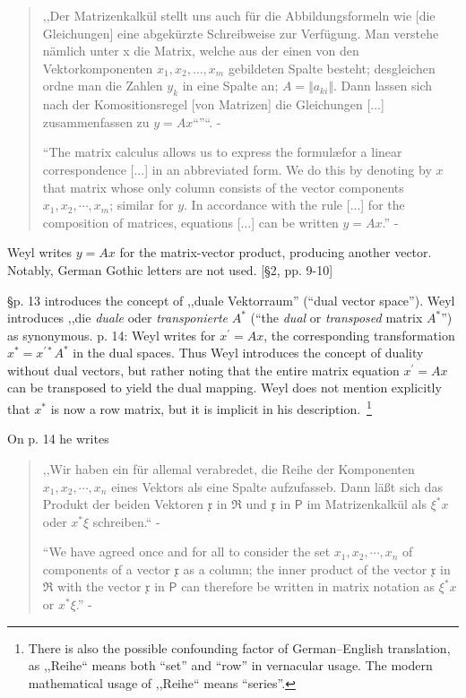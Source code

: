 \begin{quote}
,,Der Matrizenkalkül stellt uns auch für die Abbildungsformeln wie [die Gleichungen]
 eine abgekürzte Schreibweise zur Verfügung. Man verstehe nämlich unter x die Matrix, welche aus der einen von den Vektorkomponenten $x_1, x_2, \dots, x_m$ gebildeten Spalte besteht; desgleichen ordne man die Zahlen $y_k$ in eine Spalte an; $A = \Vert a_{ki} \Vert$. Dann lassen sich nach der Komositionsregel [von Matrizen] die Gleichungen [...] zusammenfassen zu $y = Ax$``''``. - \cite[p. 10]{Weyl1928}

``The matrix calculus allows us to express the formul\ae for
a linear correspondence [...] in an abbreviated form.
We do this by denoting by $x$ that matrix whose only column consists of the
vector components $x_1, x_2, \cdots, x_m$; similar
for $y$. In accordance with the rule [...] for the composition of
matrices, equations [...] can be written $y = Ax$.'' - \cite[p. 8]{Weyl1931}
\end{quote}

Weyl writes $y = A x$ for the matrix-vector product, producing another vector.
Notably, German Gothic letters are not used. [\S 2, pp. 9-10]

\S p. 13 introduces the concept of ,,duale Vektorraum'' (``dual vector space'').
Weyl introduces ,,die \textit{duale} oder \textit{transponierte} $A^*$
(``the \textit{dual} or \textit{transposed} matrix $A^*$'')
as synonymous.
p. 14: Weyl writes for $x^\prime = A x$, the corresponding transformation $x^* = x^{\prime *} A^*$
in the dual spaces.
Thus Weyl introduces the concept of duality without dual vectors, but rather noting
that the entire matrix equation $x^\prime = A x$ can be transposed to yield the
dual mapping. Weyl does not mention explicitly that $x^*$ is now a row matrix, but it is
implicit in his description.~\footnote{There is also the possible confounding
factor of German--English translation, as ,,Reihe`` means both ``set'' and ``row''
in vernacular usage. The modern mathematical usage of ,,Reihe`` means ``series''.}

On p. 14 he writes
\begin{quote}
,,Wir haben ein für allemal verabredet, die Reihe der Komponenten $x_1, x_2, \cdots, x_n$
eines Vektors als eine Spalte aufzufasseb. Dann läßt sich das Produkt der beiden
Vektoren $\mathfrak x$ in $\mathfrak R$ und $\mathfrak x$ in $\mathsf P$
im Matrizenkalkül als $\xi^* x$ oder $x^* \xi$ schreiben.`` - \cite[p. 14]{Weyl1928}

``We have agreed once and for all to consider the set
$x_1, x_2, \cdots, x_n$ of components of a vector $\mathfrak x$ as a column; the
inner product of the vector $\mathfrak x$ in $\mathfrak R$ with the vector $\mathfrak x$
in $\mathsf P$ can therefore be written in matrix notation as $\xi^* x$ or $x^* \xi$.''
- \cite[p. 14]{Weyl1931}
\end{quote}

